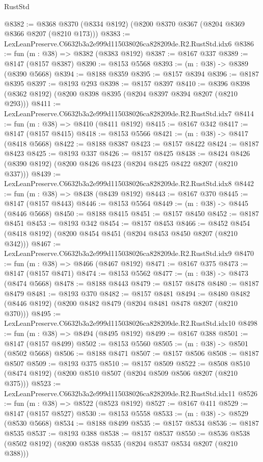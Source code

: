\begin{lexlean}{RustStd}
\begin{coremodule}
@8382 := @8368 @8370 (@8334 @8192) (@8200 @8370 @8367 (@8204 @8369 @8366 @8207 (@8210 @173)))
@8383 := LexLeanPreserve.C6632b3a2e999d115038026ca828209de.R2.RustStd.idx6
@8386 := fun (m : @38) => @8382 (@8383 @8192)
@8387 := @8167 @337
@8389 := @8147 (@8157 @8387)
@8390 := @8153 @5568
@8393 := (m : @38) -> @8389 (@8390 @5668)
@8394 := @8188 @8359
@8395 := @8157 @8394
@8396 := @8187 @8395
@8397 := @8193 @293
@8398 := @8157 @8397
@8410 := @8396 @8398 (@8362 @8192) (@8200 @8398 @8395 (@8204 @8397 @8394 @8207 (@8210 @293)))
@8411 := LexLeanPreserve.C6632b3a2e999d115038026ca828209de.R2.RustStd.idx7
@8414 := fun (m : @38) => @8410 (@8411 @8192)
@8415 := @8167 @342
@8417 := @8147 (@8157 @8415)
@8418 := @8153 @5566
@8421 := (m : @38) -> @8417 (@8418 @5668)
@8422 := @8188 @8387
@8423 := @8157 @8422
@8424 := @8187 @8423
@8425 := @8193 @337
@8426 := @8157 @8425
@8438 := @8424 @8426 (@8390 @8192) (@8200 @8426 @8423 (@8204 @8425 @8422 @8207 (@8210 @337)))
@8439 := LexLeanPreserve.C6632b3a2e999d115038026ca828209de.R2.RustStd.idx8
@8442 := fun (m : @38) => @8438 (@8439 @8192)
@8443 := @8167 @370
@8445 := @8147 (@8157 @8443)
@8446 := @8153 @5564
@8449 := (m : @38) -> @8445 (@8446 @5668)
@8450 := @8188 @8415
@8451 := @8157 @8450
@8452 := @8187 @8451
@8453 := @8193 @342
@8454 := @8157 @8453
@8466 := @8452 @8454 (@8418 @8192) (@8200 @8454 @8451 (@8204 @8453 @8450 @8207 (@8210 @342)))
@8467 := LexLeanPreserve.C6632b3a2e999d115038026ca828209de.R2.RustStd.idx9
@8470 := fun (m : @38) => @8466 (@8467 @8192)
@8471 := @8167 @375
@8473 := @8147 (@8157 @8471)
@8474 := @8153 @5562
@8477 := (m : @38) -> @8473 (@8474 @5668)
@8478 := @8188 @8443
@8479 := @8157 @8478
@8480 := @8187 @8479
@8481 := @8193 @370
@8482 := @8157 @8481
@8494 := @8480 @8482 (@8446 @8192) (@8200 @8482 @8479 (@8204 @8481 @8478 @8207 (@8210 @370)))
@8495 := LexLeanPreserve.C6632b3a2e999d115038026ca828209de.R2.RustStd.idx10
@8498 := fun (m : @38) => @8494 (@8495 @8192)
@8499 := @8167 @388
@8501 := @8147 (@8157 @8499)
@8502 := @8153 @5560
@8505 := (m : @38) -> @8501 (@8502 @5668)
@8506 := @8188 @8471
@8507 := @8157 @8506
@8508 := @8187 @8507
@8509 := @8193 @375
@8510 := @8157 @8509
@8522 := @8508 @8510 (@8474 @8192) (@8200 @8510 @8507 (@8204 @8509 @8506 @8207 (@8210 @375)))
@8523 := LexLeanPreserve.C6632b3a2e999d115038026ca828209de.R2.RustStd.idx11
@8526 := fun (m : @38) => @8522 (@8523 @8192)
@8527 := @8167 @411
@8529 := @8147 (@8157 @8527)
@8530 := @8153 @5558
@8533 := (m : @38) -> @8529 (@8530 @5668)
@8534 := @8188 @8499
@8535 := @8157 @8534
@8536 := @8187 @8535
@8537 := @8193 @388
@8538 := @8157 @8537
@8550 := @8536 @8538 (@8502 @8192) (@8200 @8538 @8535 (@8204 @8537 @8534 @8207 (@8210 @388)))

\end{coremodule}
\end{lexlean}
